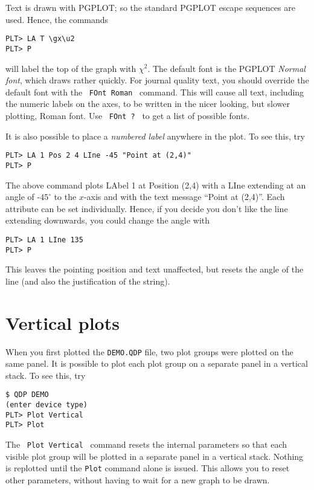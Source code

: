 Text is drawn with PGPLOT;
so the standard PGPLOT escape sequences are used.
Hence, the commands
\begin{verbatim}
PLT> LA T \gx\u2
PLT> P
\end{verbatim}
will label the top of the graph with $\chi^2$.
The default font is the PGPLOT {\em Normal font},
which draws rather quickly.
For journal quality text, you should override the default font
with the \, {\tt FOnt~Roman} \, command.
This will cause all text, including the numeric labels on the axes,
to be written in the nicer looking, but slower plotting, Roman font.
Use \, {\tt FOnt~?} \, to get a list of possible fonts.

It is also possible to place a {\em numbered label} anywhere in the plot.
To see this, try
\begin{verbatim}
PLT> LA 1 Pos 2 4 LIne -45 "Point at (2,4)"
PLT> P
\end{verbatim}
The above command plots LAbel 1 at Position (2,4)
with a LIne extending at an angle of -$45^\circ$
to the $x$-axis and with the text message ``Point at (2,4)''.
Each attribute can be set individually.
Hence, if you decide you don't like the line extending downwards, you
could change the angle with
\begin{verbatim}
PLT> LA 1 LIne 135
PLT> P
\end{verbatim}
This leaves the pointing position and text unaffected,
but resets the angle of the line
(and also the justification of the string).

\section{Vertical plots}

When you first plotted the {\tt DEMO.QDP} file,
two plot groups were plotted on the same panel.
It is possible to plot each plot group
on a separate panel in a vertical stack.
To see this, try
\begin{verbatim}
$ QDP DEMO
(enter device type)
PLT> Plot Vertical
PLT> Plot
\end{verbatim}
The \, {\tt Plot~Vertical} \, command resets the internal parameters
so that each visible plot group will be plotted in a separate
panel in a vertical stack.
Nothing is replotted
until the {\tt Plot} command alone is issued.
This allows you to reset other parameters,
without having to wait for a new graph to be drawn.

